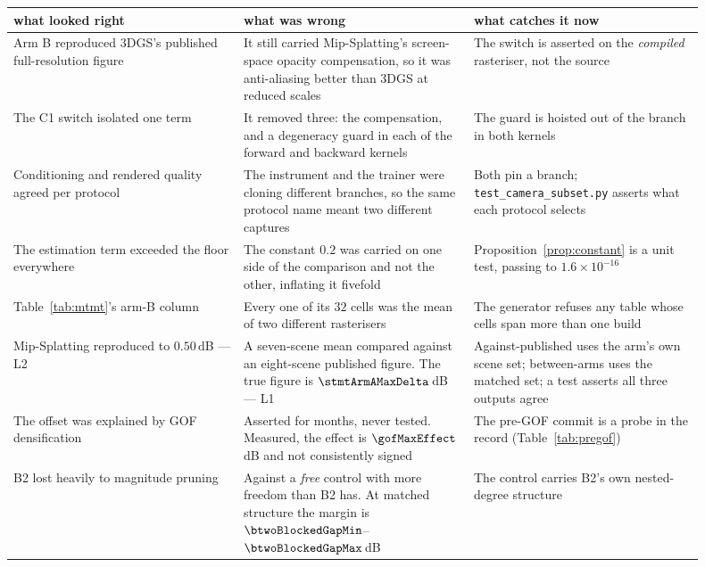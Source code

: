 \begin{center}\small
\begin{tabular}{p{0.30\linewidth}p{0.30\linewidth}p{0.30\linewidth}}
  \toprule
  what looked right & what was wrong & what catches it now \\
  \midrule
  Arm B reproduced 3DGS's published full-resolution figure &
  It still carried Mip-Splatting's screen-space opacity compensation, so it was
  anti-aliasing better than 3DGS at reduced scales &
  The switch is asserted on the \emph{compiled} rasteriser, not the source \\
  \addlinespace
  The C1 switch isolated one term &
  It removed three: the compensation, and a degeneracy guard in each of the
  forward and backward kernels &
  The guard is hoisted out of the branch in both kernels \\
  \addlinespace
  Conditioning and rendered quality agreed per protocol &
  The instrument and the trainer were cloning different branches, so the same
  protocol name meant two different captures &
  Both pin a branch; \texttt{test\_camera\_subset.py} asserts what each protocol
  selects \\
  \addlinespace
  The estimation term exceeded the floor everywhere &
  The constant $0.2$ was carried on one side of the comparison and not the other,
  inflating it fivefold &
  Proposition~\ref{prop:constant} is a unit test, passing to $1.6\times10^{-16}$ \\
  \addlinespace
  Table~\ref{tab:mtmt}'s arm-B column &
  Every one of its $32$ cells was the mean of two different rasterisers &
  The generator refuses any table whose cells span more than one build \\
  \addlinespace
  Mip-Splatting reproduced to $0.50$\,dB --- L2 &
  A seven-scene mean compared against an eight-scene published figure. The true
  figure is $\stmtArmAMaxDelta$\,dB --- L1 &
  Against-published uses the arm's own scene set; between-arms uses the matched
  set; a test asserts all three outputs agree \\
  \addlinespace
  The offset was explained by GOF densification &
  Asserted for months, never tested. Measured, the effect is
  $\gofMaxEffect$\,dB and not consistently signed &
  The pre-GOF commit is a probe in the record (Table~\ref{tab:pregof}) \\
  \addlinespace
  B2 lost heavily to magnitude pruning &
  Against a \emph{free} control with more freedom than B2 has. At matched
  structure the margin is $\btwoBlockedGapMin$--$\btwoBlockedGapMax$\,dB &
  The control carries B2's own nested-degree structure \\
  \bottomrule
\end{tabular}
\end{center}

